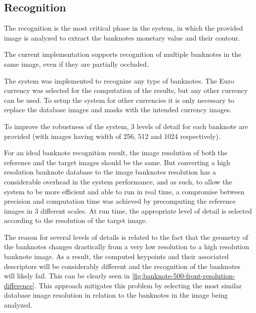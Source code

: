 \subsection{Recognition}

The recognition is the most critical phase in the system, in which the provided image is analyzed to extract the banknotes monetary value and their contour.

The current implementation supports recognition of multiple banknotes in the same image, even if they are partially occluded.

The system was implemented to recognize any type of banknotes. The Euro currency was selected for the computation of the results, but any other currency can be used. To setup the system for other currencies it is only necessary to replace the database images and masks with the intended currency images.

To improve the robustness of the system, 3 levels of detail for each banknote are provided (with images having width of 256, 512 and 1024 respectively).

For an ideal banknote recognition result, the image resolution of both the reference and the target images should be the same. But converting a high resolution banknote database to the image banknotes resolution has a considerable overhead in the system performance, and as such, to allow the system to be more efficient and able to run in real time, a compromise between precision and computation time was achieved by precomputing the reference images in 3 different scales. At run time, the appropriate level of detail is selected according to the resolution of the target image.

The reason for several levels of details is related to the fact that the geometry of the banknotes changes drastically from a very low resolution to a high resolution banknote image. As a result, the computed keypoints and their associated descriptors will be considerably different and the recognition of the banknotes will likely fail. This can be clearly seen in \cref{fig:banknote-500-front-resolution-difference}. This approach mitigates this problem by selecting the most similar database image resolution in relation to the banknotes in the image being analyzed.

